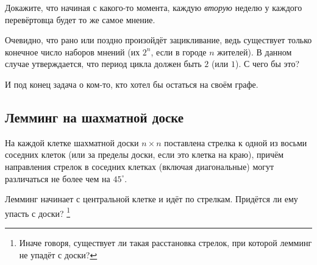 Докажите, что начиная с какого-то момента, каждую \emph{вторую} неделю у каждого перевёртовца будет то же самое мнение.

Очевидно, что рано или поздно произойдёт зацикливание, ведь существует только конечное число наборов мнений (их $2^n$, если в городе $n$ жителей). 
В данном случае утверждается, что период цикла должен быть $2$ (или $1$).
С чего бы это?

\medskip

И под конец задача о ком-то, кто хотел бы остаться на своём графе.

\subsection*{Лемминг на шахматной доске}\label{Лемминг на шахматной доске}

На каждой клетке шахматной доски $n\times n$ поставлена стрелка к одной из  восьми соседних клеток (или за пределы доски, если это клетка на краю),
причём направления стрелок в соседних клетках (включая диагональные) могут различаться не более чем на $45^\circ$.

Лемминг начинает с центральной клетке и идёт по стрелкам.
Придётся ли ему упасть с доски?%
\footnote{Иначе говоря, существует ли такая расстановка стрелок, при которой лемминг не упадёт с доски?\pr}
